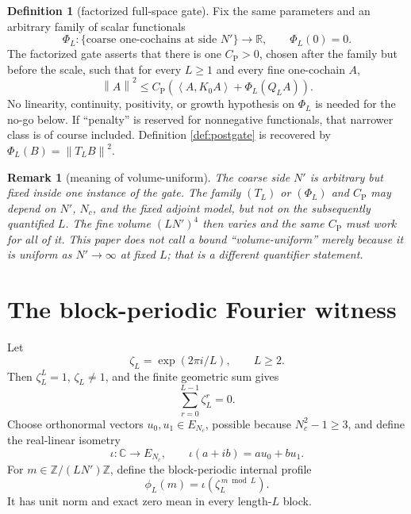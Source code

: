 \documentclass[11pt]{article}
\newtheorem{remark}[theorem]{Remark}
\theoremstyle{definition}
\newtheorem{definition}[theorem]{Definition}
\newcommand{\R}{\mathbb{R}}
\newcommand{\C}{\mathbb{C}}
\newcommand{\Z}{\mathbb{Z}}
\newcommand{\CP}{C_{\mathrm P}}
\newcommand{\ip}[2]{\left\langle #1,#2\right\rangle}
\newcommand{\norm}[1]{\left\lVert #1\right\rVert}
\begin{document}
\begin{definition}[factorized full-space gate]\label{def:factorgate}
Fix the same parameters and an arbitrary family of scalar functionals
\[
 \Phi_L:\{\text{coarse one-cochains at side }N'\}\longrightarrow\R,
 \qquad \Phi_L(0)=0.
\]
The factorized gate asserts that there is one $\CP>0$, chosen after the family
but before the scale, such that for every $L\ge1$ and every fine one-cochain
$A$,
\begin{equation}\label{eq:factorgate}
 \norm{A}^2\le\CP\left(\ip{A}{K_0A}+\Phi_L(Q_LA)\right).
\end{equation}
No linearity, continuity, positivity, or growth hypothesis on $\Phi_L$ is
needed for the no-go below.  If ``penalty'' is reserved for nonnegative
functionals, that narrower class is of course included.  Definition
\ref{def:postgate} is recovered by $\Phi_L(B)=\norm{T_LB}^2$.
\end{definition}

\begin{remark}[meaning of volume-uniform]\label{rem:volume}
The coarse side $N'$ is arbitrary but fixed inside one instance of the gate.
The family $(T_L)$ or $(\Phi_L)$ and $\CP$ may depend on $N'$, $N_c$, and the
fixed adjoint model, but not on the subsequently quantified $L$.  The fine volume $(LN')^4$
then varies and the same $\CP$ must work for all of it.  This paper does not call a bound
``volume-uniform'' merely because it is uniform as $N'\to\infty$ at fixed
$L$; that is a different quantifier statement.
\end{remark}

\section{The block-periodic Fourier witness}

Let
\[
 \zeta_L=\exp(2\pi i/L),\qquad L\ge2.
\]
Then $\zeta_L^L=1$, $\zeta_L\ne1$, and the finite geometric sum gives
\begin{equation}\label{eq:rootsum}
 \sum_{r=0}^{L-1}\zeta_L^r=0.
\end{equation}
Choose orthonormal vectors $u_0,u_1\in E_{N_c}$, possible because
$N_c^2-1\ge3$, and define the real-linear isometry
\[
 \iota:\C\longrightarrow E_{N_c},\qquad
 \iota(a+ib)=au_0+bu_1.
\]
For $m\in\Z/(LN')\Z$, define the block-periodic internal profile
\begin{equation}\label{eq:profile}
 \phi_L(m)=\iota\!\left(\zeta_L^{\,m\bmod L}\right).
\end{equation}
It has unit norm and exact zero mean in every length-$L$ block.
\end{document}
